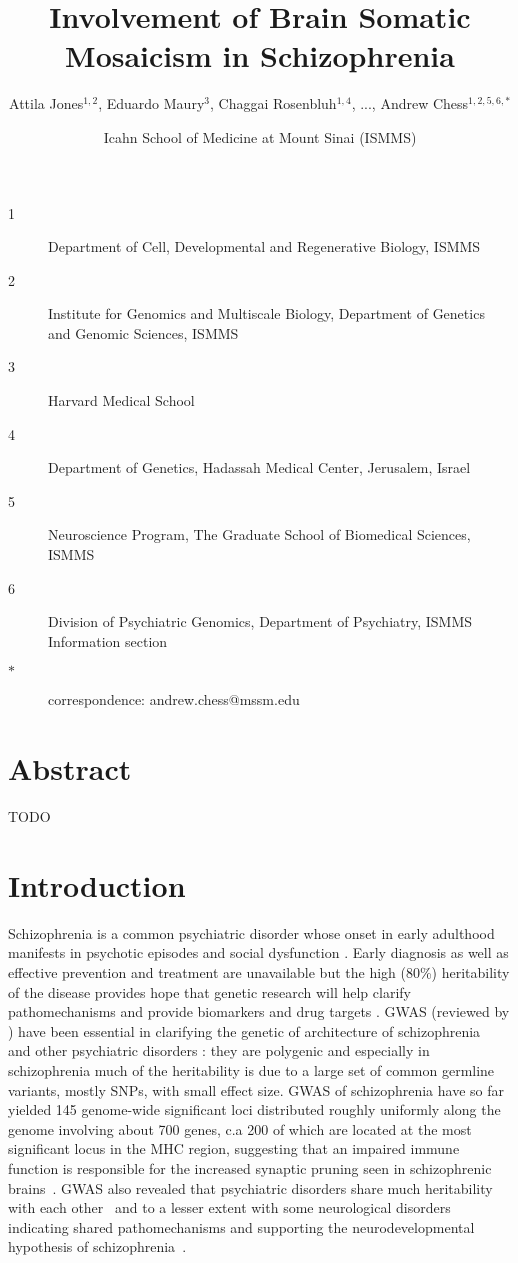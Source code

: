 \documentclass[letterpaper]{article}
\title{Involvement of Brain Somatic Mosaicism in Schizophrenia}
\author{Attila Jones\(^{1,2}\), Eduardo Maury\(^{3}\), Chaggai Rosenbluh\(^{1,4}\), ..., Andrew Chess\(^{1,2,5,6,\ast}\)}
\date{Icahn School of Medicine at Mount Sinai (ISMMS)}
\begin{document}
\maketitle

\begin{description}
\item[1] Department of Cell, Developmental and Regenerative Biology, ISMMS 
\item[2] Institute for Genomics and Multiscale Biology, Department of Genetics and Genomic Sciences, ISMMS 
\item[3] Harvard Medical School
\item[4] Department of Genetics, Hadassah Medical Center, Jerusalem, Israel
\item[5] Neuroscience Program, The Graduate School of Biomedical Sciences, ISMMS 
\item[6] Division of Psychiatric Genomics, Department of Psychiatry, ISMMS 
Information section
\item[\(\ast\)] correspondence: andrew.chess@mssm.edu 
\end{description}

\clearpage

\section*{Abstract}

TODO

\section*{Introduction}

Schizophrenia is a common psychiatric disorder whose onset in early adulthood
manifests in psychotic episodes and social dysfunction \citep{Kahn2015}.
Early diagnosis as well as effective prevention and treatment are unavailable
but the high (80\%) heritability of the disease provides hope that genetic
research will help clarify pathomechanisms and provide biomarkers and drug
targets \citep{Breen2016,Foley2017}.  GWAS (reviewed by \cite{Visscher2017})
have been essential in clarifying the genetic of architecture of
schizophrenia~\citep{Ripke2014,Pardinas2018} and other psychiatric disorders
\citep{Sullivan2012}: they are polygenic and especially in schizophrenia much
of the heritability is due to a large set of common germline variants, mostly
SNPs, with small effect size.  GWAS of schizophrenia have so far yielded 145
genome-wide significant loci distributed roughly uniformly along the genome
involving about 700 genes, c.a 200 of which are located at the most
significant locus in the MHC region, suggesting that an impaired immune
function is responsible for the increased synaptic pruning seen in
schizophrenic brains~\citep{Sekar2016a}.  GWAS
also revealed that psychiatric disorders share much heritability with each
other~\citep{Consortium2009,PsychiatricGenomicsConsortium2013} and to a lesser
extent with some neurological disorders~\citep{Consortium2018} indicating
shared pathomechanisms and supporting the neurodevelopmental hypothesis of
schizophrenia~\citep{Nour2015}.
\end{document}
